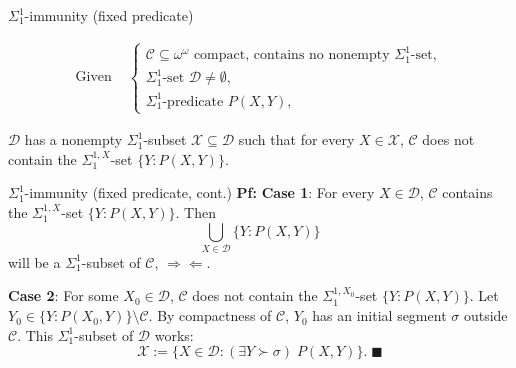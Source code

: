 \begin{frame}{$\Sigma_1^{1}$-immunity (fixed predicate)}
  \begin{lemma*}
    \begin{align*}
      \text{Given } &\begin{cases}
        \mathcal{C}\subseteq\omega^\omega \text{ compact, contains
        no nonempty } \Sigma_1^{1}\text{-set},\\
        \Sigma_1^{1}\text{-set } \mathcal{D}\neq\emptyset,\\
        \Sigma_1^{1}\text{-predicate } P(X,Y),
      \end{cases}
    \end{align*}

    \pause
    $\mathcal{D}$ has a nonempty $\Sigma_1^{1}$-subset
    $\mathcal{X}\subseteq\mathcal{D}$ such that for every
    $X\in\mathcal{X}$, $\mathcal{C}$ does not contain the
    $\Sigma_1^{1,X}$-set $\{Y:P(X,Y)\}$.
  \end{lemma*}
\end{frame}

\begin{frame}{$\Sigma_1^{1}$-immunity (fixed predicate, cont.)}
  \textbf{Pf:} \textbf{Case 1}: For every $X\in\mathcal{D}$, $\mathcal{C}$
  contains the $\Sigma_1^{1,X}$-set $\{Y:P(X,Y)\}$. Then
  \[\bigcup_{X\in\mathcal{D}} \{Y:P(X,Y)\}\]
  will be a $\Sigma_1^{1}$-subset of $\mathcal{C}$, $\Rightarrow\Leftarrow$.

  \pause
  \vspace{2em}
  \textbf{Case 2}: For some $X_0\in\mathcal{D}$, $\mathcal{C}$ does not
  contain the $\Sigma_1^{1,X_0}$-set $\{Y:P(X,Y)\}$. Let $Y_0 \in
  \{Y:P(X_0,Y)\} \setminus\mathcal{C}$. By compactness of $\mathcal{C}$,
  $Y_0$ has an initial segment $\sigma$ outside $\mathcal{C}$. This
  $\Sigma_1^{1}$-subset of $\mathcal{D}$ works: \[\mathcal{X}:=
  \{X\in\mathcal{D}: (\exists Y\succ\sigma)\; P(X,Y)\}.\; \blacksquare\]
\end{frame}

